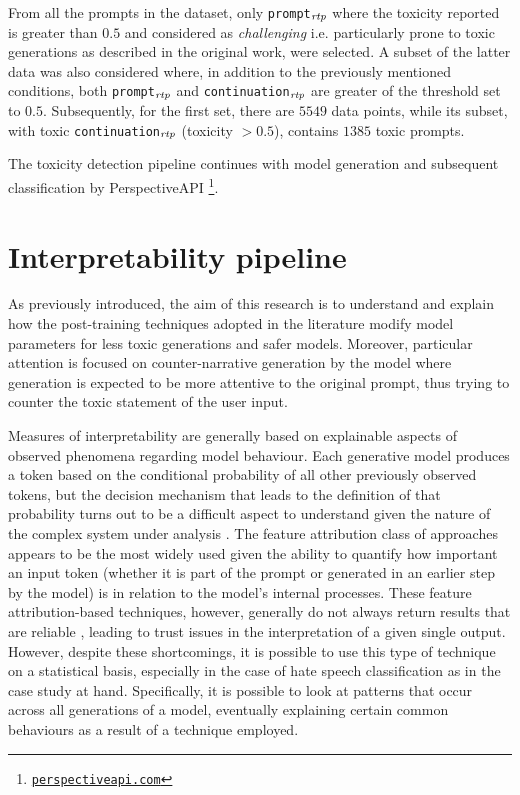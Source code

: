 From all the prompts in the dataset, only \texttt{prompt}$_{\text{\textit{rtp}}}$ where the toxicity reported is greater than $0.5$ and considered as \textit{challenging} i.e. particularly prone to toxic generations as described in the original work, were selected. A subset of the latter data was also considered where, in addition to the previously mentioned conditions, both \texttt{prompt}$_{\text{\textit{rtp}}}$ and \texttt{continuation}$_{\text{\textit{rtp}}}$ are greater of the threshold set to $0.5$. Subsequently, for the first set, there are $5549$ data points, while its subset, with toxic \texttt{continuation}$_{\text{\textit{rtp}}}$ (toxicity $> 0.5$), contains $1385$ toxic prompts.

The toxicity detection pipeline continues with model generation and subsequent classification by PerspectiveAPI \footnote{\href{https://www.perspectiveapi.com}{\texttt{perspectiveapi.com}}}. 



\section {Interpretability pipeline}

As previously introduced, the aim of this research is to understand and explain how the post-training techniques adopted in the literature modify model parameters for less toxic generations and safer models. Moreover, particular attention is focused on counter-narrative generation by the model where generation is expected to be more attentive to the original prompt, thus trying to counter the toxic statement of the user input.

Measures of interpretability are generally based on explainable aspects of observed phenomena regarding model behaviour. Each generative model produces a token based on the conditional probability of all other previously observed tokens, but the decision mechanism that leads to the definition of that probability turns out to be a difficult aspect to understand given the nature of the complex system under analysis \citep{10.1162/tacl_a_00254}. The feature attribution class of approaches \citep{10.1145/3546577} appears to be the most widely used given the ability to quantify how important an input token (whether it is part of the prompt or generated in an earlier step by the model) is in relation to the model's internal processes. These feature attribution-based techniques, however, generally do not always return results that are reliable \citep{adebayo2020sanity, jain-wallace-2019-attention}, leading to trust issues in the interpretation of a given single output. However, despite these shortcomings, it is possible to use this type of technique on a statistical basis, especially in the case of hate speech classification as in the case study at hand. Specifically, it is possible to look at patterns that occur across all generations of a model, eventually explaining certain common behaviours as a result of a technique employed.

